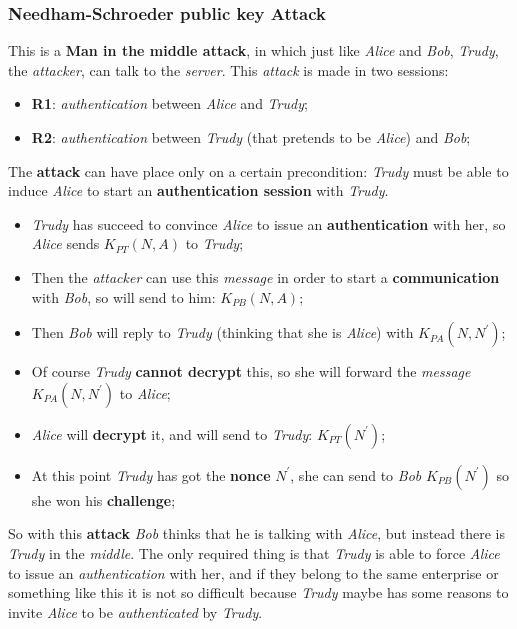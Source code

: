 \documentclass{article}
\begin{document}
\subsubsection{Needham-Schroeder public key Attack}
This is a \textbf{Man in the middle attack}, in which just like \emph{Alice} and \emph{Bob}, \emph{Trudy}, the \emph{attacker}, can talk to the \emph{server}. This \emph{attack} is made in two sessions: 
\begin{itemize}
\item \textbf{R1}: \emph{authentication} between \emph{Alice} and \emph{Trudy};
\item \textbf{R2}: \emph{authentication} between \emph{Trudy} (that pretends to be \emph{Alice}) and \emph{Bob};
\end{itemize}
The \textbf{attack} can have place only on a certain precondition: \emph{Trudy} must be able to induce \emph{Alice} to start an \textbf{authentication session} with \emph{Trudy}.
\begin{itemize}
\item \emph{Trudy} has succeed to convince \emph{Alice} to issue an \textbf{authentication} with her, so \emph{Alice} sends $K_{PT}(N,A)$ to \emph{Trudy};
\item Then the \emph{attacker} can use this \emph{message} in order to start a \textbf{communication} with \emph{Bob}, so will send to him: $K_{PB}(N,A)$;
\item Then \emph{Bob} will reply to \emph{Trudy} (thinking that she is \emph{Alice}) with $K_{PA}(N,N^{'})$;
\item Of course \emph{Trudy} \textbf{cannot decrypt} this, so she will forward the \emph{message} $K_{PA}(N,N^{'})$ to \emph{Alice};
\item \emph{Alice} will \textbf{decrypt} it, and will send to \emph{Trudy}: $K_{PT}(N^{'})$;
\item At this point \emph{Trudy} has got the \textbf{nonce} $N^{'}$, she can send to \emph{Bob} $K_{PB}(N^{'})$ so she won his \textbf{challenge};
\end{itemize}
So with this \textbf{attack} \emph{Bob} thinks that he is talking with \emph{Alice}, but instead there is \emph{Trudy} in the \emph{middle}. The only required thing is that \emph{Trudy} is able to force \emph{Alice} to issue an \emph{authentication} with her, and if they belong to the same enterprise or something like this it is not so difficult because \emph{Trudy} maybe has some reasons to invite \emph{Alice} to be \emph{authenticated} by \emph{Trudy}.
\end{document}
